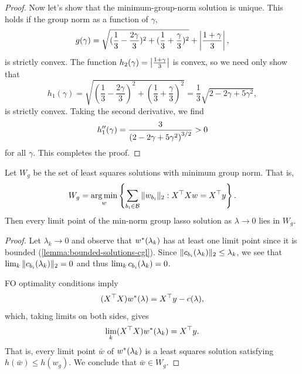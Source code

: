 \begin{proof}
    Now let's show that the minimum-group-norm solution is unique.
    This holds if the group norm as a function of \( \gamma \),
    \[
        g(\gamma) = \sqrt{(\frac{1}{3} - \frac{2 \gamma}{3})^2 + (\frac{1}{3} + \frac{\gamma}{3})^2}
        + \left\vert \frac{1 + \gamma}{3}\right\vert,
    \]
    is strictly convex.
    The function \( h_2(\gamma) = \left\vert \frac{1 + \gamma}{3}\right\vert \) is convex,
    so we need only show that
    \[
        h_1(\gamma) = \sqrt{(\frac{1}{3} - \frac{2 \gamma}{3})^2 + (\frac{1}{3} + \frac{\gamma}{3})^2}
        = \frac{1}{3} \sqrt{2 - 2\gamma + 5 \gamma^2},
    \]
    is strictly convex.
    Taking the second derivative, we find
    \[
        h_1''(\gamma) = \frac{3}{\left(2 - 2\gamma + 5 \gamma^2\right)^{3/2}} > 0
    \]
    for all \( \gamma \).
    This completes the proof.
\end{proof}

\begin{lemma}\label{lemma:lambda-convergence}
    Let \( W_{g} \) be the set of least squares solutions with minimum group norm.
    That is,
    \[
        W_{g} = \mathop{\rm arg\,min}_{w} \left\{\sum_{{b_i} \in \mathcal{B}} \|w_{b_i}\|_2 : X^\top X w = X^\top y \right\}.
    \]
    Then every limit point of the min-norm group lasso solution
    as \( \lambda \rightarrow 0 \) lies in \( W_g \).
\end{lemma}
\begin{proof}
    Let \( \lambda_k \rightarrow 0 \)
    and observe that \( w^*(\lambda_k) \) has at least one limit point
    since it is bounded (\cref{lemma:bounded-solutions-cgl}).
    Since \( \|c_{b_i}(\lambda_k)\|_2 \leq \lambda_k \),
    we see that \( \lim_{k} \|c_{b_i}(\lambda_k)\|_2 = 0 \)
    and thus \( \lim_k c_{b_i}(\lambda_k) = 0 \).

    FO optimality conditions imply
    \begin{equation}
        (X^\top X) w^*(\lambda) = X^\top y - c(\lambda),
    \end{equation}
    which, taking limits on both sides,
    gives
    \begin{equation}
        \lim_k (X^\top X) w^*(\lambda_k) = X^\top y.
    \end{equation}
    That is, every limit point \( \bar w \) of \( w^*(\lambda_k) \) is
    a least squares solution satisfying \( h(\bar w) \leq h(w_g) \).
    We conclude that \( \bar w \in W_g \).
\end{proof}

